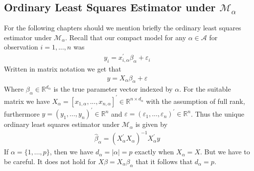 \documentclass[Research_Module_ES.tex]{subfiles}
\begin{document}
\subsection{Ordinary Least Squares Estimator under $\mathcal{M}_\alpha$}
For the following chapters should we mention briefly the ordinary least squares estimator under $\mathcal{M}_\alpha$. Recall that our compact model for any $\alpha\in\mathcal{A}$ for observation $i=1,...,n$ was
\begin{align*}
	y_i=x_{i,\alpha}^\prime\beta_\alpha+\varepsilon_i
\end{align*}
Written in matrix notation we get that
\begin{align}
	y=X_\alpha \beta_\alpha+\varepsilon  \label{CM_model_matrix}
\end{align}
Where $\beta_\alpha\in\mathbb{R}^{d_\alpha}$ is the true parameter vector indexed by $\alpha$. For the suitable matrix we have $X_\alpha=[x_{1,\alpha},...,x_{n,\alpha}]^\prime \in\mathbb{R}^{n\times d_\alpha}$ with the assumption
of full rank, furthermore $y=(y_1,...,y_n)^\prime\in\mathbb{R}^n$ and $\varepsilon=(\varepsilon_1,...,\varepsilon_n)^\prime\in\mathbb{R}^n$. Thus the unique %
ordinary least squares estimator under $\mathcal{M}_\alpha$ is given by 
\begin{align}
	\hat{\beta}_\alpha=(X_\alpha^\prime X_\alpha)^{-1}X_\alpha^\prime y
	\label{OLS}
\end{align}
If $\alpha=\{1,...,p\}$, then we have $d_\alpha=|\alpha|=p$ exactly when $X_\alpha=X$. But we have to be careful. It does not hold for $X\beta=X_\alpha\beta_\alpha$ that it follows that $d_\alpha=p$.
\end{document}
